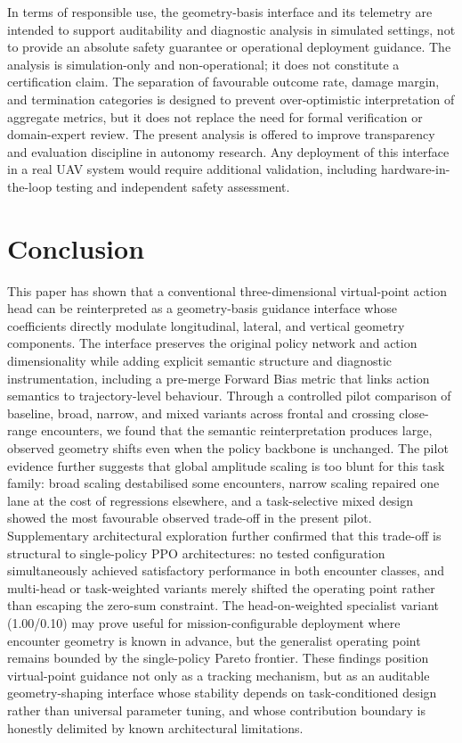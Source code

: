 \documentclass[drones,article,submit,pdftex,moreauthors]{Definitions/mdpi}
\begin{document}
In terms of responsible use, the geometry-basis interface and its telemetry are intended to support auditability and diagnostic analysis in simulated settings, not to provide an absolute safety guarantee or operational deployment guidance. The analysis is simulation-only and non-operational; it does not constitute a certification claim. The separation of favourable outcome rate, damage margin, and termination categories is designed to prevent over-optimistic interpretation of aggregate metrics, but it does not replace the need for formal verification or domain-expert review. The present analysis is offered to improve transparency and evaluation discipline in autonomy research. Any deployment of this interface in a real UAV system would require additional validation, including hardware-in-the-loop testing and independent safety assessment.

\section{Conclusion}

This paper has shown that a conventional three-dimensional virtual-point action head can be reinterpreted as a geometry-basis guidance interface whose coefficients directly modulate longitudinal, lateral, and vertical geometry components. The interface preserves the original policy network and action dimensionality while adding explicit semantic structure and diagnostic instrumentation, including a pre-merge Forward Bias metric that links action semantics to trajectory-level behaviour. Through a controlled pilot comparison of baseline, broad, narrow, and mixed variants across frontal and crossing close-range encounters, we found that the semantic reinterpretation produces large, observed geometry shifts even when the policy backbone is unchanged. The pilot evidence further suggests that global amplitude scaling is too blunt for this task family: broad scaling destabilised some encounters, narrow scaling repaired one lane at the cost of regressions elsewhere, and a task-selective mixed design showed the most favourable observed trade-off in the present pilot. Supplementary architectural exploration further confirmed that this trade-off is structural to single-policy PPO architectures: no tested configuration simultaneously achieved satisfactory performance in both encounter classes, and multi-head or task-weighted variants merely shifted the operating point rather than escaping the zero-sum constraint. The head-on-weighted specialist variant (1.00/0.10) may prove useful for mission-configurable deployment where encounter geometry is known in advance, but the generalist operating point remains bounded by the single-policy Pareto frontier. These findings position virtual-point guidance not only as a tracking mechanism, but as an auditable geometry-shaping interface whose stability depends on task-conditioned design rather than universal parameter tuning, and whose contribution boundary is honestly delimited by known architectural limitations.
\end{document}
